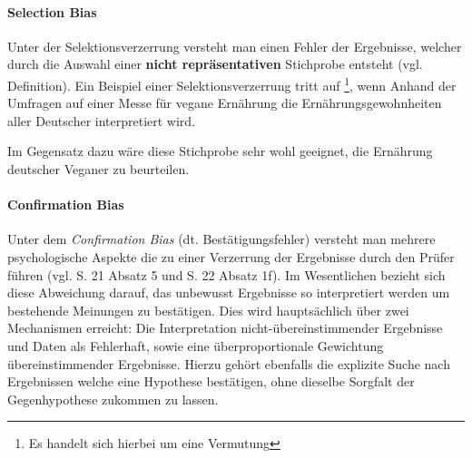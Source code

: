\paragraph{Selection Bias} Unter der Selektionsverzerrung versteht man einen Fehler der Ergebnisse, welcher durch die Auswahl einer \textbf{nicht repräsentativen} Stichprobe entsteht (vgl. \cite{SelectionBias} Definition). Ein Beispiel einer Selektionsverzerrung tritt auf \footnote{Es handelt sich hierbei um eine Vermutung}, wenn Anhand der Umfragen auf einer Messe für vegane Ernährung die Ernährungsgewohnheiten aller Deutscher interpretiert wird. 

Im Gegensatz dazu wäre diese Stichprobe sehr wohl geeignet, die Ernährung deutscher Veganer zu beurteilen.  

\paragraph{Confirmation Bias} Unter dem \textit{Confirmation Bias} (dt. Bestätigungsfehler) versteht man mehrere psychologische Aspekte die zu einer Verzerrung der Ergebnisse durch den Prüfer führen (vgl. \cite{ConfirmationBias} S. 21 Absatz 5 und S. 22 Absatz 1f). Im Wesentlichen bezieht sich diese Abweichung darauf, das unbewusst Ergebnisse so interpretiert werden um bestehende Meinungen zu bestätigen. Dies wird hauptsächlich über zwei Mechanismen erreicht: Die Interpretation nicht-übereinstimmender Ergebnisse und Daten als Fehlerhaft, sowie eine überproportionale Gewichtung übereinstimmender Ergebnisse. Hierzu gehört ebenfalls die explizite Suche nach Ergebnissen welche eine Hypothese bestätigen, ohne dieselbe Sorgfalt der Gegenhypothese zukommen zu lassen. 
